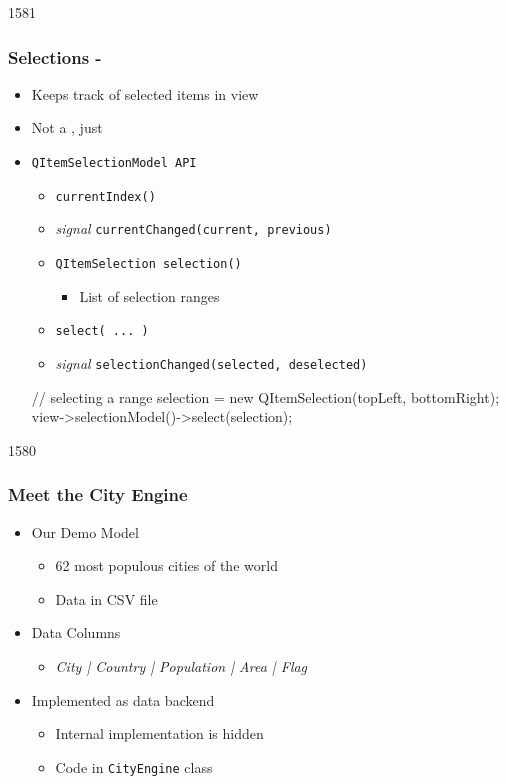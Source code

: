 \begin{slide}[fragile]{1581}\frametitle{Selections - }
  \begin{itemize}
   \item Keeps track of selected items in view
    \item Not a , just 
 \item \texttt{QItemSelectionModel API}
    \begin{itemize}
    \item \texttt{currentIndex()}
    \item \textit{signal} \texttt{currentChanged(current, previous)}
    \item \texttt{QItemSelection selection()}
      \begin{itemize}
      \item List of selection ranges
      \end{itemize}
    \item \texttt{select( ... )}
    \item \textit{signal} \texttt{selectionChanged(selected, deselected)}
  \end{itemize}
  \begin{cpp}
// selecting a range
selection = new QItemSelection(topLeft, bottomRight);
view->selectionModel()->select(selection);    
  \end{cpp}
  \end{itemize}
\end{slide}

\begin{slide}{1580}\frametitle{Meet the City Engine}
  \begin{itemize}
  \item Our Demo Model
    \begin{itemize}
    \item 62 most populous cities of the world
    \item Data in CSV file
   \end{itemize}
 \item Data Columns
    \begin{itemize}
    \item \textit{City | Country | Population | Area | Flag}
   \end{itemize}
 \item Implemented as data backend
   \begin{itemize}
   \item Internal implementation is hidden
   \item Code in \texttt{CityEngine} class
  \end{itemize}
 \end{itemize}
\end{slide}

